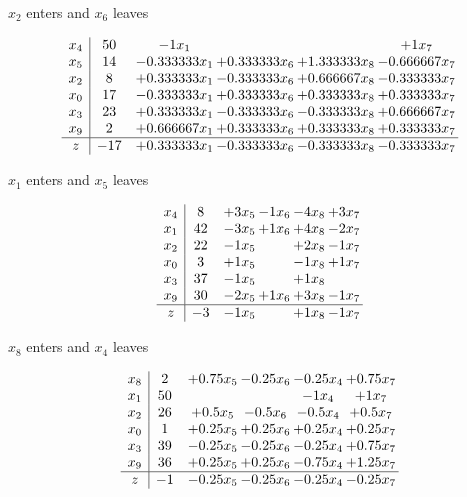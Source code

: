 \documentclass[12pt]{article}
\begin{document}
 $ x_{2} $ enters and $ x_{6} $ leaves 

 \[\begin{array}{c| c c@{\hskip 2pt} c@{\hskip 2pt} c@{\hskip 2pt} c@{\hskip 2pt} }
 x_{4}   &  50 & -1  x_{1} &    &   & + 1  x_{7}\\
 x_{5}   &  14 & -0.333333 x_{1} & + 0.333333 x_{6} & + 1.333333 x_{8} & -0.666667 x_{7}\\
 x_{2}   &  8 & + 0.333333 x_{1} & -0.333333 x_{6} & + 0.666667 x_{8} & -0.333333 x_{7}\\
 x_{0}   &  17 & -0.333333 x_{1} & + 0.333333 x_{6} & + 0.333333 x_{8} & + 0.333333 x_{7}\\
 x_{3}   &  23 & + 0.333333 x_{1} & -0.333333 x_{6} & -0.333333 x_{8} & + 0.666667 x_{7}\\
 x_{9}   &  2 & + 0.666667 x_{1} & + 0.333333 x_{6} & + 0.333333 x_{8} & + 0.333333 x_{7}\\
\hline
z    &  -17 & + 0.333333 x_{1} & -0.333333 x_{6} & -0.333333 x_{8} & -0.333333 x_{7}\\
\end{array}\]


 $ x_{1} $ enters and $ x_{5} $ leaves 

 \[\begin{array}{c| c c@{\hskip 2pt} c@{\hskip 2pt} c@{\hskip 2pt} c@{\hskip 2pt} }
 x_{4}   &  8 & + 3  x_{5} & -1  x_{6} & -4  x_{8} & + 3  x_{7}\\
 x_{1}   &  42 & -3  x_{5} & + 1  x_{6} & + 4  x_{8} & -2  x_{7}\\
 x_{2}   &  22 & -1  x_{5} &   & + 2  x_{8} & -1  x_{7}\\
 x_{0}   &  3 & + 1  x_{5} &   & -1  x_{8} & + 1  x_{7}\\
 x_{3}   &  37 & -1  x_{5} &   & + 1  x_{8} &   \\
 x_{9}   &  30 & -2  x_{5} & + 1  x_{6} & + 3  x_{8} & -1  x_{7}\\
\hline
z    &  -3 & -1  x_{5} &   & + 1  x_{8} & -1  x_{7}\\
\end{array}\]


 $ x_{8} $ enters and $ x_{4} $ leaves 

 \[\begin{array}{c| c c@{\hskip 2pt} c@{\hskip 2pt} c@{\hskip 2pt} c@{\hskip 2pt} }
 x_{8}   &  2 & + 0.75 x_{5} & -0.25 x_{6} & -0.25 x_{4} & + 0.75 x_{7}\\
 x_{1}   &  50  &    &   & -1  x_{4} & + 1  x_{7}\\
 x_{2}   &  26 & + 0.5 x_{5} & -0.5 x_{6} & -0.5 x_{4} & + 0.5 x_{7}\\
 x_{0}   &  1 & + 0.25 x_{5} & + 0.25 x_{6} & + 0.25 x_{4} & + 0.25 x_{7}\\
 x_{3}   &  39 & -0.25 x_{5} & -0.25 x_{6} & -0.25 x_{4} & + 0.75 x_{7}\\
 x_{9}   &  36 & + 0.25 x_{5} & + 0.25 x_{6} & -0.75 x_{4} & + 1.25 x_{7}\\
\hline
z    &  -1 & -0.25 x_{5} & -0.25 x_{6} & -0.25 x_{4} & -0.25 x_{7}\\
\end{array}\]
\end{document}
